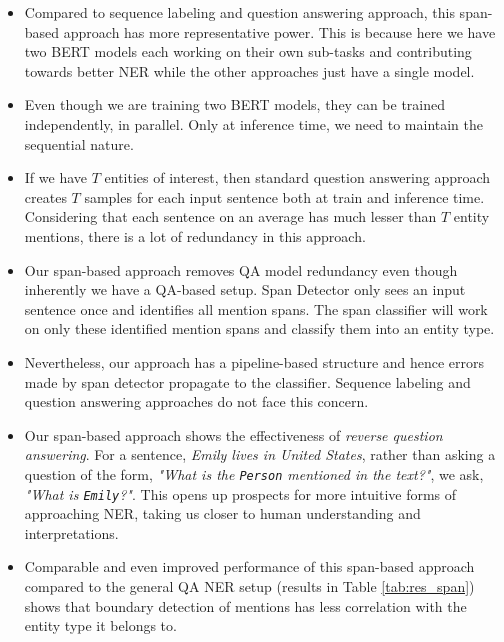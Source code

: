 \begin{itemize}
    \item Compared to sequence labeling and question answering approach, this span-based approach has more representative power. This is because here we have two BERT models each working on their own sub-tasks and contributing towards better NER while the other approaches just have a single model.
    
    \item Even though we are training two BERT models, they can be trained independently, in parallel. Only at inference time, we need to maintain the sequential nature.
    
    \item If we have $T$ entities of interest, then standard question answering approach creates $T$ samples for each input sentence both at train and inference time. Considering that each sentence on an average has much lesser than $T$ entity mentions, there is a lot of redundancy in this approach. 
    
    \item Our span-based approach removes QA model redundancy even though inherently we have a QA-based setup. Span Detector only sees an input sentence once and identifies all mention spans. The span classifier will work on only these identified mention spans and classify them into an entity type.
    
    \item Nevertheless, our approach has a pipeline-based structure and hence errors made by span detector propagate to the classifier. Sequence labeling and question answering approaches do not face this concern. 
    
    \item Our span-based approach shows the effectiveness of \textit{reverse question answering}. For a sentence, \textit{Emily lives in United States}, rather than asking a question of the form, \textit{"What is the \texttt{Person} mentioned in the text?"}, we ask, \textit{"What is \texttt{Emily}?"}. This opens up prospects for more intuitive forms of approaching NER, taking us closer to human understanding and interpretations.
    
    \item Comparable and even improved performance of this span-based approach compared to the general QA NER setup (results in Table \ref{tab:res_span}) shows that boundary detection of mentions has less correlation with the entity type it belongs to.
\end{itemize}

